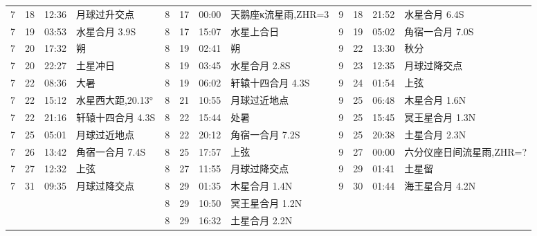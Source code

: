 \begin{tabular}{llll|llll|llll}
7 & 18 & 12:36 & 月球过升交点 & 8 & 17 & 00:00 & 天鹅座κ流星雨,ZHR=3 & 9 & 18 & 21:52 & 水星合月 6.4S \tabularnewline
7 & 19 & 03:53 & 水星合月 3.9S & 8 & 17 & 15:07 & 水星上合日 & 9 & 19 & 05:02 & 角宿一合月 7.0S \tabularnewline
7 & 20 & 17:32 & 朔 & 8 & 19 & 02:41 & 朔 & 9 & 22 & 13:30 & 秋分 \tabularnewline
7 & 20 & 22:27 & 土星冲日 & 8 & 19 & 03:45 & 水星合月 2.8S & 9 & 23 & 12:35 & 月球过降交点 \tabularnewline
7 & 22 & 08:36 & 大暑 & 8 & 19 & 06:02 & 轩辕十四合月 4.3S & 9 & 24 & 01:54 & 上弦 \tabularnewline
7 & 22 & 15:12 & 水星西大距,20.13° & 8 & 21 & 10:55 & 月球过近地点 & 9 & 25 & 06:48 & 木星合月 1.6N \tabularnewline
7 & 22 & 21:16 & 轩辕十四合月 4.3S & 8 & 22 & 15:44 & 处暑 & 9 & 25 & 15:45 & 冥王星合月 1.3N \tabularnewline
7 & 25 & 05:01 & 月球过近地点 & 8 & 22 & 20:12 & 角宿一合月 7.2S & 9 & 25 & 20:38 & 土星合月 2.3N \tabularnewline
7 & 26 & 13:42 & 角宿一合月 7.4S & 8 & 25 & 17:57 & 上弦 & 9 & 27 & 00:00 & 六分仪座日间流星雨,ZHR=? \tabularnewline
7 & 27 & 12:32 & 上弦 & 8 & 27 & 11:55 & 月球过降交点 & 9 & 29 & 01:41 & 土星留 \tabularnewline
7 & 31 & 09:35 & 月球过降交点 & 8 & 29 & 01:35 & 木星合月 1.4N & 9 & 30 & 01:44 & 海王星合月 4.2N \tabularnewline
 &  &  &  & 8 & 29 & 10:50 & 冥王星合月 1.2N &  &  &  &  \tabularnewline
 &  &  &  & 8 & 29 & 16:32 & 土星合月 2.2N &  &  &  &  \tabularnewline
\hline \end{tabular}

